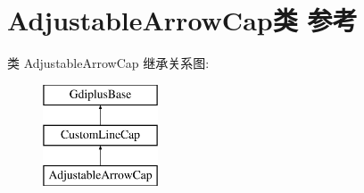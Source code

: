 \hypertarget{class_adjustable_arrow_cap}{}\section{Adjustable\+Arrow\+Cap类 参考}
\label{class_adjustable_arrow_cap}
类 Adjustable\+Arrow\+Cap 继承关系图\+:\begin{figure}[H]
\begin{center}
\leavevmode
\includegraphics[height=3.000000cm]{class_adjustable_arrow_cap}
\end{center}
\end{figure}
